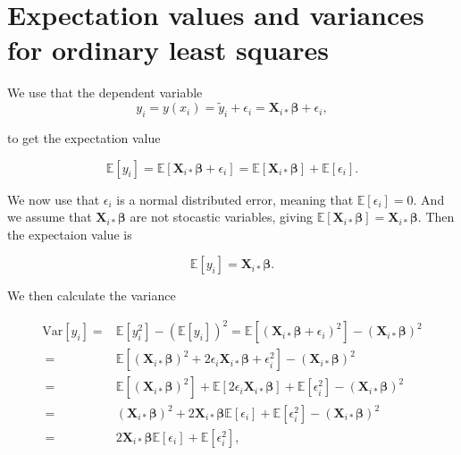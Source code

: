 \appendix
\section{Expectation values and variances for ordinary least squares}\label{app:ols_expactation_variance}
We use that the dependent variable
$$
y_i = y(x_i) = \tilde{y}_i + \epsilon_i = \mathbf X_{i*}\boldsymbol{\beta} + \epsilon_i,
$$

to get the expectation value



$$
\mathbb{E}[y_i] = \mathbb{E}[\mathbf X_{i*}\boldsymbol{\beta} + \epsilon_i] = \mathbb{E}[\mathbf X_{i*}\boldsymbol{\beta}] + \mathbb{E}[\epsilon_i].
$$

We now use that $\epsilon_i$ is a normal distributed error, meaning that $\mathbb{E}[\epsilon_i]=0$. And we assume that $\mathbf X_{i*}\boldsymbol{\beta}$ are not stocastic variables, giving $\mathbb{E}[\mathbf X_{i*}\boldsymbol{\beta}]=\mathbf X_{i*}\boldsymbol{\beta}$. Then the expectaion value is

\begin{equation}\label{eq:expectation_yi}
\mathbb{E}[y_i] = \mathbf X_{i*}\boldsymbol{\beta}.
\end{equation}

We then calculate the variance


\begin{align*}
\mbox{Var}[y_i] =& \mathbb{E}[y_i^2] - (\mathbb{E}[y_i])^2 = \mathbb{E}[(\mathbf X_{i*}\boldsymbol{\beta} + \epsilon_i)^2]- (\mathbf X_{i*}\boldsymbol{\beta})^2
\\
\ =& \mathbb{E}[(\mathbf X_{i*}\boldsymbol{\beta})^2+2\epsilon_i \mathbf X_{i*}\boldsymbol{\beta}+\epsilon_i^2]-(\mathbf X_{i*}\boldsymbol{\beta})^2
\\
\ =& \mathbb{E}[(\mathbf X_{i*}\boldsymbol{\beta})^2] + \mathbb{E}[2\epsilon_i \mathbf X_{i*}\boldsymbol{\beta}] + \mathbb{E}[\epsilon_i^2]-(\mathbf X_{i*}\boldsymbol{\beta})^2
\\
\ =& (\mathbf X_{i*}\boldsymbol{\beta})^2 + 2\mathbf X_{i*}\boldsymbol{\beta}\mathbb{E}[\epsilon_i ] + \mathbb{E}[\epsilon_i^2]-(\mathbf X_{i*}\boldsymbol{\beta})^2
\\
\ =& 2\mathbf X_{i*}\boldsymbol{\beta}\mathbb{E}[\epsilon_i ] + \mathbb{E}[\epsilon_i^2],
\end{align*}


